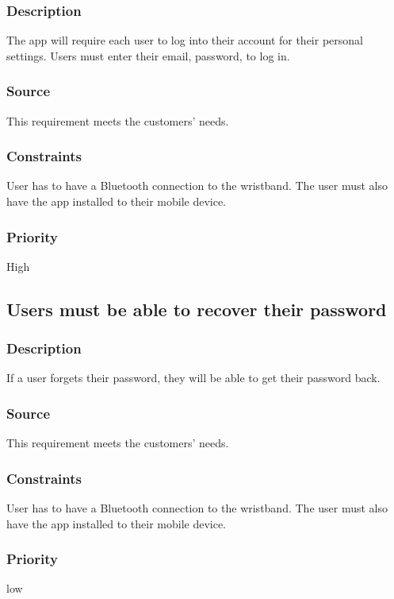 \subsubsection{Description}
The app will require each user to log into their account for their personal settings. Users must enter their email, password, to log in.
\subsubsection{Source}
This requirement meets the customers' needs.
\subsubsection{Constraints}
User has to have a Bluetooth connection to the wristband. The user must also have the app installed to their mobile device.
\subsubsection{Priority}
High


\subsection{Users must be able to recover their password}
\subsubsection{Description}
If a user forgets their password, they will be able to get their password back.
\subsubsection{Source}
This requirement meets the customers' needs.
\subsubsection{Constraints}
User has to have a Bluetooth connection to the wristband. The user must also have the app installed to their mobile device.
\subsubsection{Priority}
low
